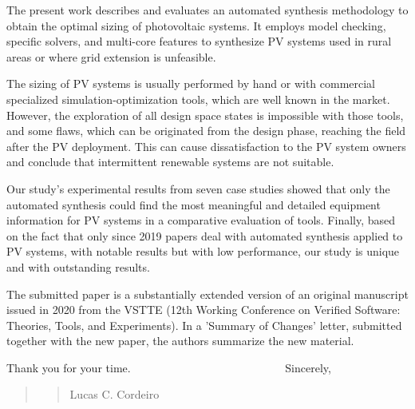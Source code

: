 \documentclass[11pt]{article}
\newcommand\vi{\vspace{\baselineskip}}
\begin{document}
The present work describes and evaluates an automated synthesis methodology to obtain the optimal sizing of photovoltaic systems. It employs model checking, specific solvers, and multi-core features to synthesize PV systems used in rural areas or where grid extension is unfeasible.

The sizing of PV systems is usually performed by hand or with commercial specialized simulation-optimization tools, which are well known in the market. However, the exploration of all design space states is impossible with those tools, and some flaws, which can be originated from the design phase, reaching the field after the PV deployment. This can cause dissatisfaction to the PV system owners and conclude that intermittent renewable systems are not suitable.
   
Our study's experimental results from seven case studies showed that only the automated synthesis could find the most meaningful and detailed equipment information for PV systems in a comparative evaluation of tools. Finally, based on the fact that only since 2019 papers deal with automated synthesis applied to PV systems, with notable results but with low performance, our study is unique and with outstanding results.

The submitted paper is a substantially extended version of an original
manuscript issued in 2020 from the VSTTE (12th Working Conference on Verified Software: Theories, Tools, and Experiments). In a 'Summary of Changes' letter, submitted together with the new paper, the authors summarize the new material.

\vi
Thank you for your time.
\vi
\indent
~~~~~~~~~~~~~~~~~~~~~~~~~~~Sincerely,\\



\begin{quote}
\begin{quote}
\begin{flushright}



Lucas C. Cordeiro~~~~~~~
\end{flushright}
\end{quote}
\end{quote}


 
 
\end{document}

